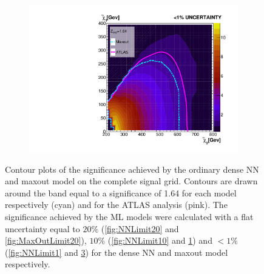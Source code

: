\begin{figure}[H]
{\begin{subfigure}{.45\textwidth}
        \vspace{-0.75cm}
        \vspace*{-33.1ex}  %
        \begin{center}
        \tiny
        \hspace{-44.5ex}
        \cite{atlas_search_2021}
        \end{center}
        \vspace*{34.1ex}
        \vspace{-1.cm}
        \caption{}
        \label{fig:MaxOutLimit10}
    \end{subfigure}
    \hfill
    \begin{subfigure}{.45\textwidth}
        \includegraphics[width=\textwidth]{Figures/MLResults/NN/SUSY/Comparison/Limits/MaxOutLimit1.pdf}
        \vspace{-0.75cm}
        \vspace*{-33.1ex}  %
        \begin{center}
        \tiny
        \hspace{-44.5ex}
        \cite{atlas_search_2021}
        \end{center}
        \vspace*{34.1ex}
        \vspace{-1.cm}
        \caption{}
        \label{fig:MaxOutLimit1}
    \end{subfigure}
    }
    \caption[Contour plots 
    of the significance achieved by the ordinary dense \acs{NN} and maxout model on the complete signal grid. Contours are drawn 
    around the band equal to a significance of 1.64 for each model respectively (cyan) and for the \acs{ATLAS} analysis (pink).]{ Contour plots 
    of the significance achieved by the ordinary dense \acs{NN} and maxout model on the complete signal grid. Contours are drawn 
    around the band equal to a significance of 1.64 for each model respectively (cyan) and for the \acs{ATLAS} analysis \cite{atlas_search_2021} (pink). The 
    significance achieved by the \acs{ML} models were calculated with a flat uncertainty equal to $20\%$ (\ref{fig:NNLimit20} and \ref{fig:MaxOutLimit20}),
    $10\%$ (\ref{fig:NNLimit10} and \ref{fig:MaxOutLimit10}) and $<1\%$ (\ref{fig:NNLimit1} and \ref{fig:MaxOutLimit1}) for the dense \acs{NN} and maxout model
    respectively.}
\end{figure}